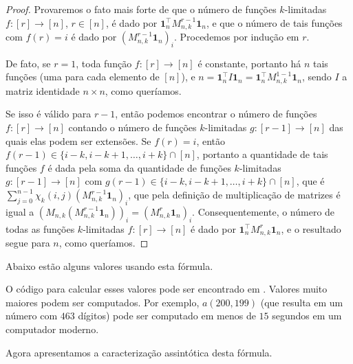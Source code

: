 \begin{proof}

  Provaremos o fato mais forte de que o número de funções $k$-limitadas $f : [r] \to [n]$, $r \in [n]$, é dado por $\mathbf{1}_n^\intercal M_{n,k}^{r - 1} \mathbf{1}_n$, e que o número de tais funções com $f(r) = i$ é dado por $(M_{n,k}^{r - 1} \mathbf{1}_n)_i$. Procedemos por indução em $r$.

  De fato, se $r = 1$, toda função $f : [r] \to [n]$ é constante, portanto há $n$ tais funções (uma para cada elemento de $[n]$), e $n = \mathbf{1}_n^\intercal I \mathbf{1}_n = \mathbf{1}_n^\intercal M_{n,k}^{1 - 1} \mathbf{1}_n$, sendo $I$ a matriz identidade $n \times n$, como queríamos.

  Se isso é válido para $r - 1$, então podemos encontrar o número de funções $f : [r] \to [n]$ contando o número de funções $k$-limitadas $g : [r-1] \to [n]$ das quais elas podem ser extensões. Se $f(r) = i$, então $f(r - 1) \in \{i - k, i - k + 1, \dots, i + k\} \cap [n]$, portanto a quantidade de tais funções $f$ é dada pela soma da quantidade de funções $k$-limitadas $g : [r-1] \to [n]$ com $g(r-1) \in \{i - k, i - k + 1, \dots, i + k\} \cap [n]$, que é $\sum_{j = 0}^{n-1} \chi_k(i, j) (M_{n,k}^{r-1} \mathbf{1}_n)_i$, que pela definição de multiplicação de matrizes é igual a $(M_{n,k} (M_{n,k}^{r-1} \mathbf{1}_n))_i = (M_{n,k}^r \mathbf{1}_n)_i$. Consequentemente, o número de todas as funções $k$-limitadas $f : [r] \to [n]$ é dado por $\mathbf{1}_n^\intercal M_{n,k}^r \mathbf{1}_n$, e o resultado segue para $n$, como queríamos.

\end{proof}

Abaixo estão alguns valores usando esta fórmula.



O código para calcular esses valores pode ser encontrado em \cite{github}. Valores muito maiores podem ser computados. Por exemplo, $a(200,199)$ (que resulta em um número com $463$ dígitos) pode ser computado em menos de $15$ segundos em um computador moderno.

Agora apresentamos a caracterização assintótica desta fórmula.

